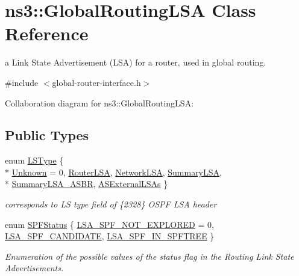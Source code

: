 \hypertarget{classns3_1_1GlobalRoutingLSA}{}\section{ns3\+:\+:Global\+Routing\+L\+SA Class Reference}
\label{classns3_1_1GlobalRoutingLSA}


a Link State Advertisement (L\+SA) for a router, used in global routing.  




{\ttfamily \#include $<$global-\/router-\/interface.\+h$>$}



Collaboration diagram for ns3\+:\+:Global\+Routing\+L\+SA\+:
\subsection*{Public Types}
\begin{DoxyCompactItemize}
\item 
enum \hyperlink{classns3_1_1GlobalRoutingLSA_a34eb53a1ed37c877923b74d671224fde}{L\+S\+Type} \{ \\*
\hyperlink{classns3_1_1GlobalRoutingLSA_a34eb53a1ed37c877923b74d671224fdeaa9e2c39d09a2815be51b0da5141cb778}{Unknown} = 0, 
\hyperlink{classns3_1_1GlobalRoutingLSA_a34eb53a1ed37c877923b74d671224fdeada9e6185a392b3bb450846f5282e415d}{Router\+L\+SA}, 
\hyperlink{classns3_1_1GlobalRoutingLSA_a34eb53a1ed37c877923b74d671224fdeab37398976cdc8ddd08e1428a4700b5b4}{Network\+L\+SA}, 
\hyperlink{classns3_1_1GlobalRoutingLSA_a34eb53a1ed37c877923b74d671224fdea9865d30714efba3f637b21cb9955eb03}{Summary\+L\+SA}, 
\\*
\hyperlink{classns3_1_1GlobalRoutingLSA_a34eb53a1ed37c877923b74d671224fdeab66a3f8848580e029696601cd821dc0d}{Summary\+L\+S\+A\+\_\+\+A\+S\+BR}, 
\hyperlink{classns3_1_1GlobalRoutingLSA_a34eb53a1ed37c877923b74d671224fdea695b98ad474baaa5f11ff5bb06048ec7}{A\+S\+External\+L\+S\+As}
 \}\begin{DoxyCompactList}\small\item\em corresponds to LS type field of \{2328\} O\+S\+PF L\+SA header \end{DoxyCompactList}
\item 
enum \hyperlink{classns3_1_1GlobalRoutingLSA_a18bf63da580856fe1cc158aa855af1bd}{S\+P\+F\+Status} \{ \hyperlink{classns3_1_1GlobalRoutingLSA_a18bf63da580856fe1cc158aa855af1bda0d9a91161488cead75d479293fd05a94}{L\+S\+A\+\_\+\+S\+P\+F\+\_\+\+N\+O\+T\+\_\+\+E\+X\+P\+L\+O\+R\+ED} = 0, 
\hyperlink{classns3_1_1GlobalRoutingLSA_a18bf63da580856fe1cc158aa855af1bda9f23e66077c059f58318033586e74c50}{L\+S\+A\+\_\+\+S\+P\+F\+\_\+\+C\+A\+N\+D\+I\+D\+A\+TE}, 
\hyperlink{classns3_1_1GlobalRoutingLSA_a18bf63da580856fe1cc158aa855af1bda2a14fe5ba992deb9a1cb953f77ec8072}{L\+S\+A\+\_\+\+S\+P\+F\+\_\+\+I\+N\+\_\+\+S\+P\+F\+T\+R\+EE}
 \}\begin{DoxyCompactList}\small\item\em Enumeration of the possible values of the status flag in the Routing Link State Advertisements. \end{DoxyCompactList}
\end{DoxyCompactItemize}
